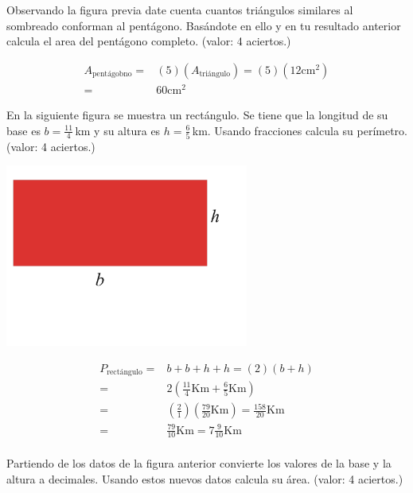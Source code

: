 \documentclass[11pt]{article}
\begin{document}
Observando la figura previa date cuenta cuantos tri\'angulos similares al
sombreado conforman al pent\'agono. Bas\'andote en ello y en tu resultado
anterior calcula el area del pent\'agono completo. (valor: 4 aciertos.)

\begin{align*}
A_{\text{pent\'agobno}} =& (5)(A_{\text{tri\'angulo}}) = (5)(12\text{cm}^{2}) \\
                        =& 60\text{cm}^{2} 
\end{align*}

En la siguiente figura se muestra un rect\'angulo. Se tiene que la longitud de
su base es $b=\frac{11}{4}$\,km y su altura es $h=\frac{6}{5}$\,km. Usando
fracciones calcula su per\'imetro. (valor: 4 aciertos.)

\begin{minipage}[h!]{0.5\textwidth}
    \includegraphics[width=0.6\textwidth]{./rectangulo}
    \label{fig:rectangulo}
\end{minipage} \hspace{-2cm}
\begin{minipage}[h!]{0.5\textwidth}
\begin{align*}
P_{\text{rect\'angulo}} =& b + b + h + h = (2)(b+h) \\
            =& 2 \left( \frac{11}{4}\text{Km} + \frac{6}{5}\text{Km} \right) \\
            =& \left( \frac{2}{1} \right) \left( \frac{79}{20}\text{Km} \right)
            = \frac{158}{20}\text{Km} \\
            =& \frac{79}{10}\text{Km}
            = 7 \frac{9}{10}\text{Km} \\
\end{align*}
\null
\par\xdef\tpd{\the\prevdepth}
\end{minipage}

\newpage

Partiendo de los datos de la figura anterior convierte los valores de la base y
la altura a decimales. Usando estos nuevos datos calcula su \'area. (valor: 4
aciertos.)
\end{document}
